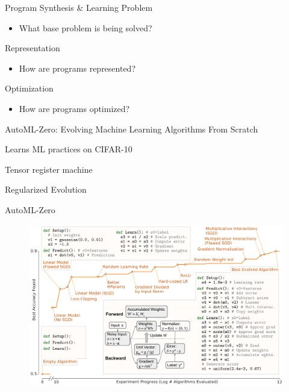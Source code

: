 \documentclass[aspectratio=169]{beamer}
\makeatletter
\renewcommand{\emph}[1]{{\Huge \color{pureminimalistic@text@red} #1}}
\newcommand{\white}[1]{{\color{pureminimalistic@text@white} #1}}
\makeatother
\begin{document}
\begin{frame}{\white{Program Synthesis \& Learning}}
    \emph{Problem} 
    \begin{itemize}
        \item What base problem is being solved?
    \end{itemize}
    \vspace{1em}
    \emph{Representation} 
    \begin{itemize}
        \item How are programs represented?
    \end{itemize}
    \vspace{1em}
    \emph{Optimization} 
    \begin{itemize}
        \item How are programs optimized?
    \end{itemize}
\end{frame}

\begin{frame}{AutoML-Zero: Evolving Machine Learning Algorithms From Scratch \white{\cite{real2020automl}}}
    \begin{vfilleditems}
        \item \Huge Learns ML practices on CIFAR-10 
        \vspace{0.7em}
        \item \Huge Tensor register machine
        \vspace{0.7em}
        \item \emph{Regularized Evolution} 
    \end{vfilleditems}
\end{frame}

\begin{frame}[plain]{AutoML-Zero \white{\cite{real2020automl}}}
\begin{figure}
\centering
\includegraphics[scale=0.37]{figures/automl_zero_main_fig.png}
\end{figure}
\end{frame}
\end{document}

